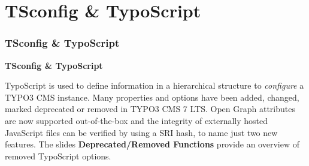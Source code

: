 %

\section{TSconfig \& TypoScript}
\begin{frame}[fragile]
	\frametitle{TSconfig \& TypoScript}

	\begin{center}\huge{\color{typo3darkgrey}\textbf{TSconfig \& TypoScript}}\end{center}

	TypoScript is used to define information in a hierarchical structure to
	\textit{configure} a TYPO3 CMS instance. Many properties and options have been added,
	changed, marked deprecated or removed in TYPO3 CMS 7 LTS.\newline
	Open Graph attributes are now supported out-of-the-box and the integrity of externally
	hosted JavaScript files can be verified by using a SRI hash, to name just two new
	features.\newline
	The slides \textbf{Deprecated/Removed Functions} provide an overview of removed
	TypoScript options.

\end{frame}

